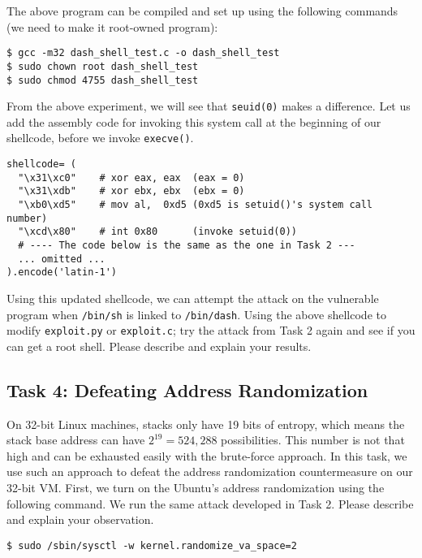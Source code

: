 The above program can be compiled and set up using the following 
commands (we need to make it root-owned \setuid program):

\begin{lstlisting}
$ gcc -m32 dash_shell_test.c -o dash_shell_test
$ sudo chown root dash_shell_test
$ sudo chmod 4755 dash_shell_test
\end{lstlisting}


From the above experiment, we will see that 
\texttt{seuid(0)} makes a difference.  Let us add the assembly 
code for invoking this system call at the beginning of our shellcode, before 
we invoke \texttt{execve()}. 

\begin{lstlisting}
shellcode= (
  "\x31\xc0"    # xor eax, eax  (eax = 0)
  "\x31\xdb"    # xor ebx, ebx  (ebx = 0)
  "\xb0\xd5"    # mov al,  0xd5 (0xd5 is setuid()'s system call number)
  "\xcd\x80"    # int 0x80      (invoke setuid(0))
  # ---- The code below is the same as the one in Task 2 ---
  ... omitted ...
).encode('latin-1')
\end{lstlisting}


Using this updated shellcode, we can attempt the attack on the vulnerable
program when \texttt{/bin/sh} is linked to \texttt{/bin/dash}. Using the above shellcode 
to modify \texttt{exploit.py} or \texttt{exploit.c}; try the attack from Task 2 again and see
if you can get a root shell. 
Please describe and explain your results.


\subsection{Task 4: Defeating Address Randomization}

On 32-bit Linux machines, stacks only have 19 bits of entropy, which means the stack base
address can have $2^{19} = 524,288$ possibilities.  This number is not that high and can be
exhausted easily with the brute-force approach. In this task,
we use such an approach to defeat the address randomization countermeasure 
on our 32-bit VM. 
First, we turn on the Ubuntu's address randomization using the 
following command.  We run the same attack
developed in Task 2. Please describe and explain your observation.

\begin{lstlisting}
$ sudo /sbin/sysctl -w kernel.randomize_va_space=2
\end{lstlisting}


